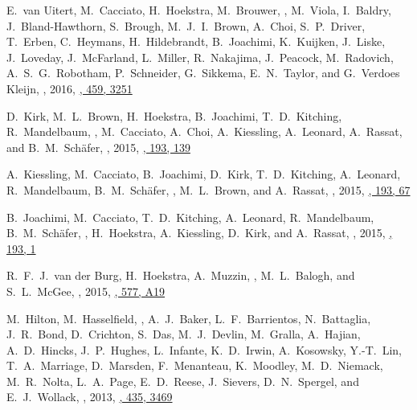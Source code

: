 \item
E.~van Uitert, M.~Cacciato, H.~Hoekstra, M.~Brouwer, \myself, M.~Viola, I.~Baldry, J.~Bland-Hawthorn, S.~Brough, M.~J.~I.~Brown, A.~Choi, S.~P.~Driver, T.~Erben, C.~Heymans, H.~Hildebrandt, B.~Joachimi, K.~Kuijken, J.~Liske, J.~Loveday, J.~McFarland, L.~Miller, R.~Nakajima, J.~Peacock, M.~Radovich, A.~S.~G.~Robotham, P.~Schneider, G.~Sikkema, E.~N.~Taylor, and G.~Verdoes Kleijn,
,
2016, \href{https://ui.adsabs.harvard.edu/abs/2016MNRAS.459.3251V}{\mnras, 459, 3251}

\item
D.~Kirk, M.~L.~Brown, H.~Hoekstra, B.~Joachimi, T.~D.~Kitching, R.~Mandelbaum, \myself, M.~Cacciato, A.~Choi, A.~Kiessling, A.~Leonard, A.~Rassat, and B.~M.~Schäfer,
,
2015, \href{https://ui.adsabs.harvard.edu/abs/2015SSRv..193..139K}{\ssr, 193, 139}

\item
A.~Kiessling, M.~Cacciato, B.~Joachimi, D.~Kirk, T.~D.~Kitching, A.~Leonard, R.~Mandelbaum, B.~M.~Schäfer, \myself, M.~L.~Brown, and A.~Rassat,
,
2015, \href{https://ui.adsabs.harvard.edu/abs/2015SSRv..193...67K}{\ssr, 193, 67}

\item
B.~Joachimi, M.~Cacciato, T.~D.~Kitching, A.~Leonard, R.~Mandelbaum, B.~M.~Schäfer, \myself, H.~Hoekstra, A.~Kiessling, D.~Kirk, and A.~Rassat,
,
2015, \href{https://ui.adsabs.harvard.edu/abs/2015SSRv..193....1J}{\ssr, 193, 1}

\item
R.~F.~J.~van der Burg, H.~Hoekstra, A.~Muzzin, \myself, M.~L.~Balogh, and S.~L.~McGee,
,
2015, \href{https://ui.adsabs.harvard.edu/abs/2015A&A...577A..19V}{\aap, 577, A19}

\item
M.~Hilton, M.~Hasselfield, \myself, A.~J.~Baker, L.~F.~Barrientos, N.~Battaglia, J.~R.~Bond, D.~Crichton, S.~Das, M.~J.~Devlin, M.~Gralla, A.~Hajian, A.~D.~Hincks, J.~P.~Hughes, L.~Infante, K.~D.~Irwin, A.~Kosowsky, Y.-T.~Lin, T.~A.~Marriage, D.~Marsden, F.~Menanteau, K.~Moodley, M.~D.~Niemack, M.~R.~Nolta, L.~A.~Page, E.~D.~Reese, J.~Sievers, D.~N.~Spergel, and E.~J.~Wollack,
,
2013, \href{https://ui.adsabs.harvard.edu/abs/2013MNRAS.435.3469H}{\mnras, 435, 3469}

